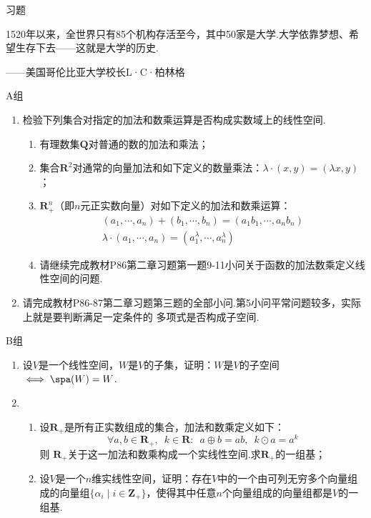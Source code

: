 \centerline{\heiti \Large 习题}
\vspace{2ex}
{\kaishu 1520年以来，全世界只有85个机构存活至今，其中50家是大学.大学依靠梦想、希望生存下去——这就是大学的历史.}
\begin{flushright}
    \kaishu
    ——美国哥伦比亚大学校长L·C·柏林格
\end{flushright}
\centerline{\heiti A组}
\begin{enumerate}
    \item 检验下列集合对指定的加法和数乘运算是否构成实数域上的线性空间.
    \begin{enumerate}[label=(\arabic*)]
        \item 有理数集$\mathbf{Q}$对普通的数的加法和乘法；

        \item 集合$\mathbf{R}^2$对通常的向量加法和如下定义的数量乘法：$\lambda\cdot(x,y)=(\lambda x,y)$；

        \item $\mathbf{R}_+^n$（即$n$元正实数向量）对如下定义的加法和数乘运算：
        \begin{gather*}
            (a_1,\cdots,a_n)+(b_1,\cdots,b_n)=(a_1b_1,\cdots,a_nb_n) \\
            \lambda\cdot(a_1,\cdots,a_n)=(a_1^\lambda,\cdots,a_n^\lambda)
        \end{gather*}

        \item 请继续完成教材P86第二章习题第一题9-11小问关于函数的加法数乘定义线性空间的问题.
    \end{enumerate}
    \item 请完成教材P86-87第二章习题第三题的全部小问.第5小问平常问题较多，实际上就是要判断满足一定条件的
          多项式是否构成子空间.
\end{enumerate}
\centerline{\heiti B组}
\begin{enumerate}
    \item 设$V$是一个线性空间，$W$是$V$的子集，证明：$W$是$V$的子空间$\iff \spa(W)=W$.
    \item \begin{enumerate}[label=(\arabic*)]
        \item 设$\mathbf{R}_+$是所有正实数组成的集合，加法和数乘定义如下：\[ \forall a,b \in \mathbf{R}_+,\enspace k\in \mathbf{R}\colon\enspace a\oplus b = ab,\enspace k\odot a = a^k \] 则 $\mathbf{R}_+$关于这一加法和数乘构成一个实线性空间.求$\mathbf{R}_+$的一组基；

        \item 设$V$是一个$n$维实线性空间，证明：存在$V$中的一个由可列无穷多个向量组成的向量组$\{\alpha_i \mid i\in\mathbf{Z}_+\}$，使得其中任意$n$个向量组成的向量组都是$V$的一组基.
    \end{enumerate}
\end{enumerate}
